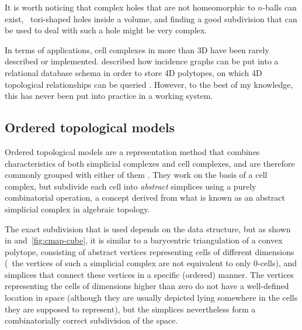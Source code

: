 It is worth noticing that complex holes that are not homeomorphic to $n$-balls can exist, \eg\ tori-shaped holes inside a volume, and finding a good subdivision that can be used to deal with such a hole might be very complex.

In terms of applications, cell complexes in more than 3D have been rarely described or implemented.
\citet{Hazelton90} described how incidence graphs can be put into a relational database schema in order to store 4D polytopes, on which 4D topological relationships can be queried \citep{Hazelton92}.
However, to the best of my knowledge, this has never been put into practice in a working system.

\subsection{Ordered topological models}
\label{ss:ordered-topological-models}

Ordered topological models are a representation method that combines characteristics of both simplicial complexes and cell complexes, and are therefore commonly grouped with either of them \citep{deFloriani05,Comic12}.
They work on the basis of a cell complex, but subdivide each cell into \emph{abstract} simplices using a purely combinatorial operation, a concept derived from what is known as an abstract simplicial complex in algebraic topology.

The exact subdivision that is used depends on the data structure, but as shown in  and~\ref{fig:cmap-cube}, it is similar to a barycentric triangulation of a convex polytope, consisting of abstract vertices representing cells of different dimensions (\ie\ the vertices of such a simplicial complex are not equivalent to only 0-cells), and simplices that connect these vertices in a specific (ordered) manner.
The vertices representing the cells of dimensions higher than zero do not have a well-defined location in space (although they are usually depicted lying somewhere in the cells they are supposed to represent), but the simplices nevertheless form a combinatorially correct subdivision of the space.


